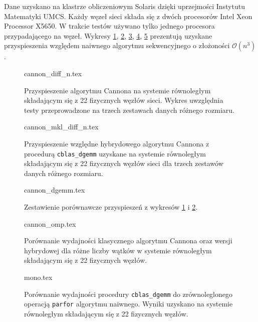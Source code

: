 Dane uzyskano na klastrze obliczeniowym Solaris dzięki uprzejmości Instytutu Matematyki UMCS. Każdy węzeł sieci składa się z dwóch procesorów Intel Xeon Processor X5650. W trakcie testów używano tylko jednego procesora przypadającego na węzeł. Wykresy \ref{pl:cannon_seq_diff}, \ref{pl:cannon_dgemm_diff}, \ref{pl:compar_dgemm}, \ref{pl:cannon_omp}, \ref{pl:mono} prezentują uzyskane przyspieszenia względem naiwnego algorytmu sekwencyjnego o złożoności \(\mathcal{O}(n^3)\).

\begin{figure}[hb]
\centering
\footnotesize
{cannon_diff_n.tex}
\caption{Przyspieszenie algorytmu Cannona na systemie równoległym składającym się z 22 fizycznych węzłów sieci. Wykres uwzględnia testy przeprowadzone na trzech zestawach danych różnego rozmiaru.}
\label{pl:cannon_seq_diff}
\end{figure}

\begin{figure}[hb]
\centering
\footnotesize
{cannon_mkl_diff_n.tex}
\caption{Przyspieszenie względne hybrydowego algorytmu Cannona z procedurą \texttt{cblas\_dgemm} uzyskane na systemie równoległym składającym się z 22 fizycznych węzłów sieci dla trzech zestawów danych różnego rozmiaru.}
\label{pl:cannon_dgemm_diff}
\end{figure}

\begin{figure}[hb]
\centering
\footnotesize
{cannon_dgemm.tex}
\caption{Zestawienie porównawcze przyspieszeń z wykresów \ref{pl:cannon_seq_diff} i \ref{pl:cannon_dgemm_diff}.} 
\label{pl:compar_dgemm}
\end{figure}

\begin{figure}[hb]
\centering
\footnotesize
{cannon_omp.tex}
\caption{Porównanie wydajności klasycznego algorytmu Cannona oraz wersji hybrydowej dla różne liczby wątków w systemie równoległym składającym się z 22 fizycznych węzłów.}
\label{pl:cannon_omp}
\end{figure}

\begin{figure}[hb]
\centering
\footnotesize
{mono.tex}
\caption{Porównanie wydajności procedury \texttt{cblas\_dgemm} do zrównoleglonego operacją \texttt{parfor} algorytmu naiwnego. Wyniki uzyskano na systemie równoległym składającym się z 22 fizycznych węzłów.}
\label{pl:mono}
\end{figure}

